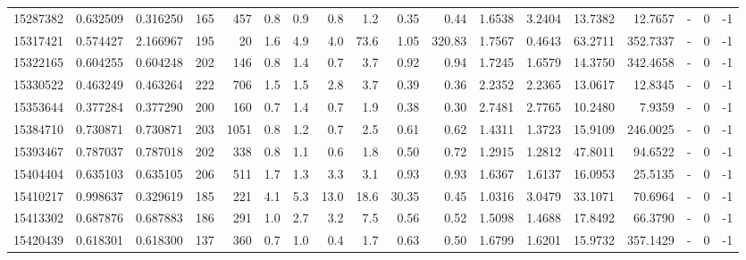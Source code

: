 \begin{tabular}{rrrrrrrrrrrrrrrlrr}
  15287382 & 0.632509 &   0.316250 &  165 &  457 &      0.8 &      0.9 &     0.8 &      1.2 &       0.35 &        0.44 &  1.6538 &  3.2404 &   13.7382 &   12.7657 &             - &        0 &         -1 \\
  15317421 & 0.574427 &   2.166967 &  195 &   20 &      1.6 &      4.9 &     4.0 &     73.6 &       1.05 &      320.83 &  1.7567 &  0.4643 &   63.2711 &  352.7337 &             - &        0 &         -1 \\
  15322165 & 0.604255 &   0.604248 &  202 &  146 &      0.8 &      1.4 &     0.7 &      3.7 &       0.92 &        0.94 &  1.7245 &  1.6579 &   14.3750 &  342.4658 &             - &        0 &         -1 \\
  15330522 & 0.463249 &   0.463264 &  222 &  706 &      1.5 &      1.5 &     2.8 &      3.7 &       0.39 &        0.36 &  2.2352 &  2.2365 &   13.0617 &   12.8345 &             - &        0 &         -1 \\
  15353644 & 0.377284 &   0.377290 &  200 &  160 &      0.7 &      1.4 &     0.7 &      1.9 &       0.38 &        0.30 &  2.7481 &  2.7765 &   10.2480 &    7.9359 &             - &        0 &         -1 \\
  15384710 & 0.730871 &   0.730871 &  203 & 1051 &      0.8 &      1.2 &     0.7 &      2.5 &       0.61 &        0.62 &  1.4311 &  1.3723 &   15.9109 &  246.0025 &             - &        0 &         -1 \\
  15393467 & 0.787037 &   0.787018 &  202 &  338 &      0.8 &      1.1 &     0.6 &      1.8 &       0.50 &        0.72 &  1.2915 &  1.2812 &   47.8011 &   94.6522 &             - &        0 &         -1 \\
  15404404 & 0.635103 &   0.635105 &  206 &  511 &      1.7 &      1.3 &     3.3 &      3.1 &       0.93 &        0.93 &  1.6367 &  1.6137 &   16.0953 &   25.5135 &             - &        0 &         -1 \\
  15410217 & 0.998637 &   0.329619 &  185 &  221 &      4.1 &      5.3 &    13.0 &     18.6 &      30.35 &        0.45 &  1.0316 &  3.0479 &   33.1071 &   70.6964 &             - &        0 &         -1 \\
  15413302 & 0.687876 &   0.687883 &  186 &  291 &      1.0 &      2.7 &     3.2 &      7.5 &       0.56 &        0.52 &  1.5098 &  1.4688 &   17.8492 &   66.3790 &             - &        0 &         -1 \\
  15420439 & 0.618301 &   0.618300 &  137 &  360 &      0.7 &      1.0 &     0.4 &      1.7 &       0.63 &        0.50 &  1.6799 &  1.6201 &   15.9732 &  357.1429 &             - &        0 &         -1 \\

\end{tabular}
